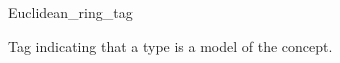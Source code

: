 \begin{ccRefClass}{Euclidean_ring_tag}
\label{Euclidean_ring_tag}

\ccDefinition
Tag indicating that a type is a model of the 
 concept. 

\ccInheritsFrom
{}

\ccIsModel
{}

\ccSeeAlso
{} \\
\\
\end{ccRefClass} 